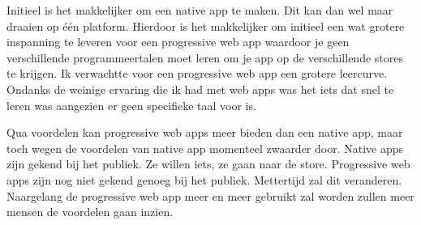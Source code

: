 Initieel is het makkelijker om een native app te maken. Dit kan dan wel maar draaien op één platform. Hierdoor is het makkelijker om initieel een wat grotere inspanning te leveren voor een progressive web app waardoor je geen verschillende programmeertalen moet leren om je app op de  verschillende stores te krijgen.
Ik verwachtte voor een progressive web app een grotere leercurve. Ondanks de weinige ervaring die ik had met web apps was het iets dat snel te leren was aangezien er geen specifieke taal voor is. 

Qua voordelen kan progressive web apps meer bieden dan een native app, maar toch wegen de voordelen van native app momenteel zwaarder door. Native apps zijn gekend bij het publiek. Ze willen iets, ze gaan naar de store. Progressive web apps zijn nog niet gekend genoeg bij het publiek. Mettertijd zal dit veranderen. Naargelang de progressive web app meer en meer gebruikt zal worden zullen meer mensen de voordelen gaan inzien.
 


